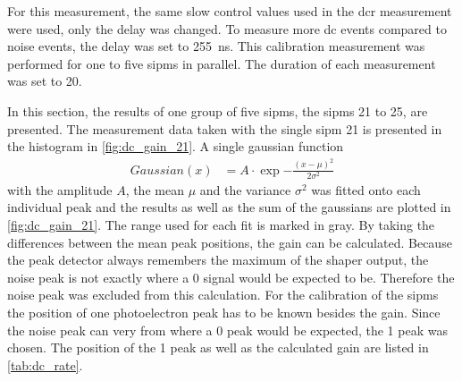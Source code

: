 For this measurement, the same slow control values used in the \ac{dcr} measurement were used, only the delay was changed.
To measure more \ac{dc} events compared to noise events, the delay was set to \SI{255}{\nano\second}.
This calibration measurement was performed for one to five \acp{sipm} in parallel.
The duration of each measurement was set to \SI{20}{\minutes}.


In this section, the results of one group of five \acp{sipm}, the \acp{sipm} 21 to 25, are presented.
The measurement data taken with the single \ac{sipm} 21 is presented in the histogram in \autoref{fig:dc_gain_21}.
A single gaussian function
\begin{align}
	Gaussian(x) &= A\cdot\exp{-\frac{(x-\mu)^2}{2\sigma^2}}
\end{align}
with the amplitude $A$, the mean $\mu$ and the variance $\sigma^2$ was fitted onto each individual peak and the results as well as the sum of the gaussians are plotted in \autoref{fig:dc_gain_21}.
The range used for each fit is marked in gray.
By taking the differences between the mean peak positions, the gain can be calculated.
Because the peak detector always remembers the maximum of the shaper output, the noise peak is not exactly where a \SI{0}{\pe} signal would be expected to be.
Therefore the noise peak was excluded from this calculation.
For the calibration of the \acp{sipm} the position of one photoelectron peak has to be known besides the gain. 
Since the noise peak can very from where a \SI{0}{\pe} peak would be expected, the \SI{1}{\pe} peak was chosen.
The position of the \SI{1}{\pe} peak as well as the calculated gain are listed in \autoref{tab:dc_rate}.


